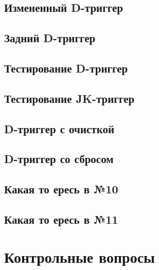 \documentclass[a4paper,14pt]{article}
\begin{document}
\subsection{Измененный D-триггер}



\subsection{Задний D-триггер}



\subsection{Тестирование D-триггер}

\subsection{Тестирование JK-триггер}

\subsection{D-триггер с очисткой}


\subsection{D-триггер со сбросом}


\subsection{Какая то ересь в №10}


\subsection{Какая то ересь в №11}


\section{Контрольные вопросы}
\end{document}
